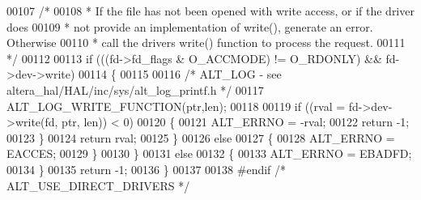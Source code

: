 \begin{DoxyCode}
00107     \textcolor{comment}{/*}
00108 \textcolor{comment}{     * If the file has not been opened with write access, or if the driver does}
00109 \textcolor{comment}{     * not provide an implementation of write(), generate an error. Otherwise}
00110 \textcolor{comment}{     * call the drivers write() function to process the request.}
00111 \textcolor{comment}{     */}
00112 
00113     \textcolor{keywordflow}{if} (((fd->fd_flags & O\_ACCMODE) != O\_RDONLY) && fd->dev->write)
00114     \{
00115       
00116       \textcolor{comment}{/* ALT\_LOG - see altera\_hal/HAL/inc/sys/alt\_log\_printf.h */}
00117       ALT_LOG_WRITE_FUNCTION(ptr,len);
00118 
00119       \textcolor{keywordflow}{if} ((rval = fd->dev->write(fd, ptr, len)) < 0)
00120       \{
00121         ALT_ERRNO = -rval;
00122         \textcolor{keywordflow}{return} -1;
00123       \}
00124       \textcolor{keywordflow}{return} rval;
00125     \}
00126     \textcolor{keywordflow}{else}
00127     \{
00128       ALT_ERRNO = EACCES;
00129     \}
00130   \}
00131   \textcolor{keywordflow}{else}  
00132   \{
00133     ALT_ERRNO = EBADFD;
00134   \}
00135   \textcolor{keywordflow}{return} -1;
00136 \}
00137 
00138 \textcolor{preprocessor}{#endif }\textcolor{comment}{/* ALT\_USE\_DIRECT\_DRIVERS */}\textcolor{preprocessor}{}
\end{DoxyCode}
